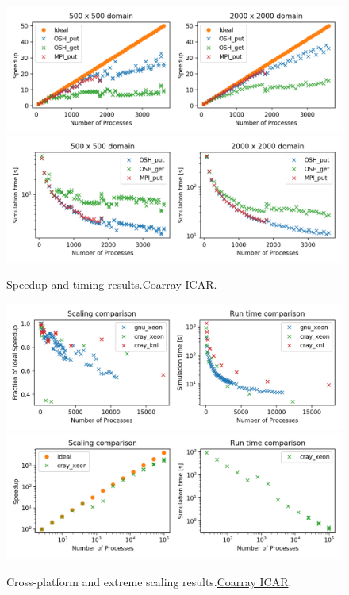 \begin{figure}
  \includegraphics[width=\textwidth]{figures/fig1_speedup.png}
  \includegraphics[width=\textwidth]{figures/fig2_timing.png}
  \caption{Speedup and timing results.\href{https://github.com/gutmann/coarray_icar}{Coarray ICAR}.\label{fig1-2}}
\end{figure}

\begin{figure}
  \includegraphics[width=\textwidth]{figures/fig3_cross_platform.png}
  \includegraphics[width=\textwidth]{figures/fig4_extreme_scaling.png}
   \caption{Cross-platform and extreme scaling results.\href{https://github.com/gutmann/coarray_icar}{Coarray ICAR}.\label{fig3-4}}
\end{figure}

